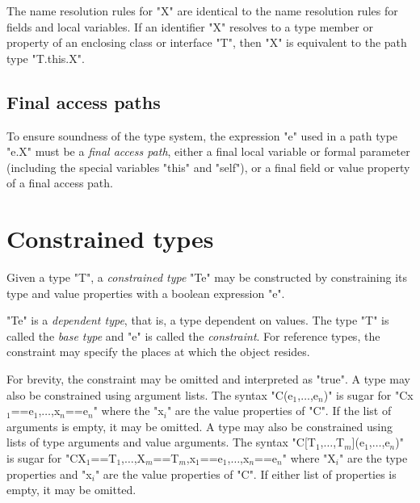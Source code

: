 The name resolution rules for \xcd"X" are identical to the name
resolution rules for fields and local variables.
If an identifier \xcd"X" resolves to a type member or property
of an enclosing class or interface \xcd"T", then \xcd"X" is equivalent to
the path type \xcd"T.this.X".

\iftypeparams
\subsection{Final access paths}
\label{FinalAccessPath}

        To ensure soundness of the type system, the expression \xcd"e"
	used in a path type \xcd"e.X" must be a \emph{final access
	path}, either a final local variable or formal parameter
	(including the special variables \xcd"this" and \xcd"self"),
	or a final field or value property of a final access path.
\fi

\section{Constrained types}
\label{ConstrainedTypes}
\label{DepType:DepType}
\label{DepTypes}


        Given a type \xcd"T", a {\em constrained type}
        \xcd"T{e}" may be
        constructed by constraining its
        \iftypeparams\else
        type and value
        \fi
        properties with a
        boolean expression \xcd"e".

        \xcd"T{e}" is a {\em dependent type}, that is, a type
        dependent on values.
        The type \xcd"T" is called the
        {\em base type} and \xcd"e" is called the {\em constraint}.
        For reference types, the constraint may
        specify the places at which the object resides.

For brevity, the constraint may be omitted and
interpreted as \xcd"true".
\iftypeparams
A type may also be constrained using argument lists.
The syntax 
\xcdmath"C(e$_1$,$\dots$,e$_n$)" is sugar for
\xcdmath"C{x$_1$==e$_1$,$\dots$,x$_n$==e$_n$}"
where the \xcdmath"x$_i$" are the
value properties of \xcd"C".  
If the list of arguments is empty, it may be omitted.
\else
A type may also be constrained using lists of type arguments and
value arguments.
The syntax 
\xcdmath"C[T$_1$,$\dots$,T$_m$](e$_1$,$\dots$,e$_n$)" is sugar for
\xcdmath"C{X$_1$==T$_1$,$\dots$,X$_m$==T$_m$,x$_1$==e$_1$,$\dots$,x$_n$==e$_n$}"
where \xcdmath"X$_i$" are the type properties and \xcdmath"x$_i$" are the
value properties of \xcd"C".  
If either list of properties is empty, it may be omitted.
\fi

